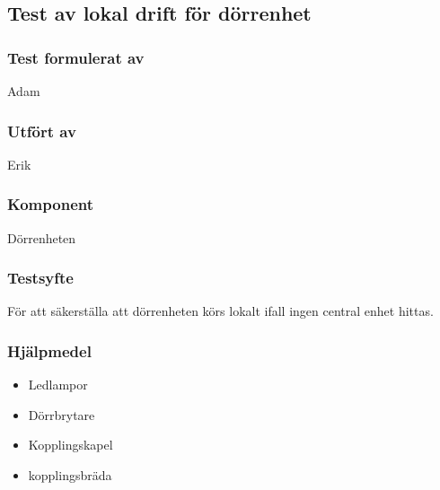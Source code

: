 \clearpage
\subsection{Test av lokal drift för dörrenhet}
\label{test:localDrift}

\setlength{\columnsep}{1cm}




\begin{multicols}{2}
\subsubsection*{Test formulerat av}
Adam

\subsubsection*{Utfört av}
Erik


\end{multicols}
\subsubsection*{Komponent}
Dörrenheten


\subsubsection*{Testsyfte}
För att säkerställa att dörrenheten körs lokalt ifall ingen central enhet hittas.


\subsubsection*{Hjälpmedel}
\begin{itemize}
	\item Ledlampor
	\item Dörrbrytare
	\item Kopplingskapel
	\item kopplingsbräda
\end{itemize}



